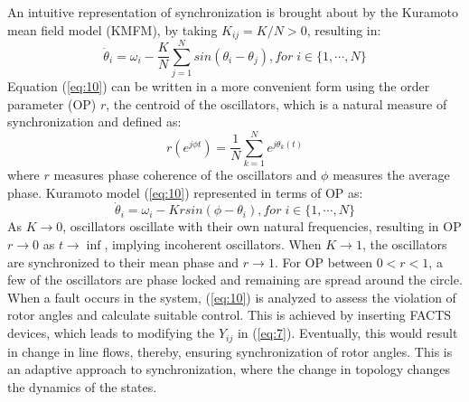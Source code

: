\documentclass{ifacconf}
\begin{document}
An intuitive representation of synchronization is brought about by the Kuramoto mean field model (KMFM), by taking $K_{ij}=K/N>0$, resulting in:
\begin{equation}\label{eq:10}
\dot \theta_{i}=\omega_{i}-\frac{K}{N} \sum_{j=1}^{N} sin (\theta_{i}-\theta_{j}),  for\;i \in \lbrace1,\cdots,N \rbrace 
\end{equation}
Equation (\ref{eq:10}) can be written in a more convenient form using the order parameter (OP) $r$, the centroid of the oscillators, which is a
natural measure of synchronization and defined as:%
\begin{equation}\label{eq:11}
  r(e^{j\phi t})=\frac{1}{N}\sum_{k=1}^{N} e^{j\theta_{k}(t)} 
\end{equation}
where $r$ measures phase coherence of the oscillators and $\phi$ measures the average phase. Kuramoto model (\ref{eq:10}) represented in terms of OP as:
\begin{equation}\label{eq:12}
 \dot \theta_{i}=\omega_{i}-K r sin (\phi-\theta_{i}), for\;i \in \lbrace1,\cdots,N \rbrace 
\end{equation}
As $ K \rightarrow 0 $, oscillators oscillate with their own natural frequencies, resulting in OP $ r \rightarrow 0 $ as $ t \rightarrow \inf $, implying incoherent oscillators. When $K \rightarrow1 $, the oscillators are synchronized to their mean phase and $r \rightarrow1$. For OP between $ 0 < r < 1 $, a few of the oscillators are phase locked and remaining are spread around the circle. \\
When a fault occurs in the system, (\ref{eq:10}) is analyzed to assess the violation of rotor angles and calculate suitable control. This is achieved by inserting FACTS devices, which leads to modifying the $ Y_{ij} $ in (\ref{eq:7}). Eventually, this would result in change in line flows, thereby, ensuring synchronization of rotor angles. This is an adaptive approach to synchronization, where the change in topology changes the dynamics of the states. \\
\vspace{-1em}
\end{document}
